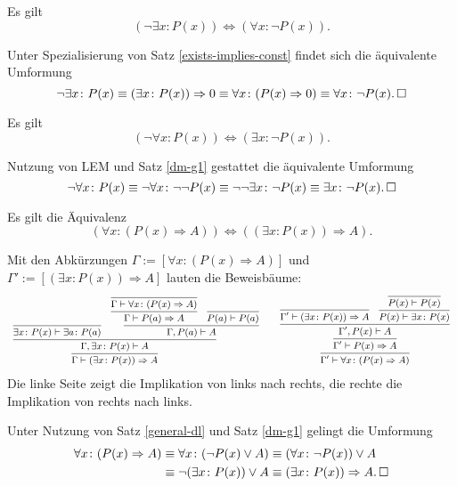\begin{Satz}%
\label{dm-g1} Es gilt
\[(\neg\exists x\colon P(x))\iff (\forall x\colon \neg P(x)).\]
\end{Satz}
\begin{Beweis} Unter Spezialisierung von Satz \ref{exists-implies-const}
findet sich die äquivalente Umformung%
\[\neg\exists x\colon P(x)\equiv (\exists x\colon P(x))\Rightarrow 0
\equiv \forall x\colon (P(x)\Rightarrow 0)
\equiv \forall x\colon \neg P(x).\,\square\]
\end{Beweis}
\begin{Satz}%
\label{dm-g2} Es gilt
\[(\neg\forall x\colon P(x))\iff (\exists x\colon \neg P(x)).\]
\end{Satz}
\begin{Beweis}
Nutzung von LEM und Satz \ref{dm-g1} gestattet die äquivalente
Umformung%
\[\neg\forall x\colon P(x)
\equiv\neg\forall x\colon \neg\neg P(x)
\equiv\neg\neg\exists x\colon \neg P(x)
\equiv\exists x\colon \neg P(x).\,\square\]
\end{Beweis}

\begin{Satz}\label{exists-implies-const}
Es gilt die Äquivalenz
\[(\forall x\colon (P(x)\Rightarrow A))
\iff ((\exists x\colon P(x))\Rightarrow A).\]
\end{Satz}
\begin{Beweis}[Beweis 1] Mit den Abkürzungen $\Gamma:=[\forall x\colon (P(x)\Rightarrow A)]$
und $\Gamma':=[(\exists x\colon P(x))\Rightarrow A]$
lauten die Beweisbäume:
\[\begin{array}{c@{\qquad}c}\small
\infer{\Gamma\vdash (\exists x\colon P(x))\Rightarrow A}{
  \infer{\Gamma,\exists x\colon P(x)\vdash A}{
    \infer{\exists x\colon P(x)\vdash\exists a\colon P(a)}{}
  & \infer{\Gamma,P(a)\vdash A}{
      \infer{\Gamma\vdash P(a)\Rightarrow A}{
        \infer{\Gamma\vdash\forall x\colon (P(x)\Rightarrow A)}{}}
    & \infer{P(a)\vdash P(a)}{}}}}
&\small
\infer{\Gamma'\vdash\forall x\colon (P(x)\Rightarrow A)}{
  \infer{\Gamma'\vdash P(x)\Rightarrow A}{
    \infer{\Gamma',P(x)\vdash A}{
      \infer{\Gamma'\vdash (\exists x\colon P(x))\Rightarrow A}{}
    & \infer{P(x)\vdash \exists x\colon P(x)}{
        \infer{P(x)\vdash P(x)}{}}}}}
\end{array}
\]
Die linke Seite zeigt die Implikation von links nach rechts,
die rechte die Implikation von rechts nach links.\,\qedsymbol
\end{Beweis}
\begin{Beweis}
Unter Nutzung von Satz \ref{general-dl}
und Satz \ref{dm-g1} gelingt die Umformung
\begin{align*}
\forall x\colon (P(x)\Rightarrow A)
&\equiv \forall x\colon (\neg P(x)\lor A)
\equiv (\forall x\colon \neg P(x))\lor A\\
&\equiv \neg (\exists x\colon P(x))\lor A
\equiv (\exists x\colon P(x))\Rightarrow A.\,\square
\end{align*}
\end{Beweis}

